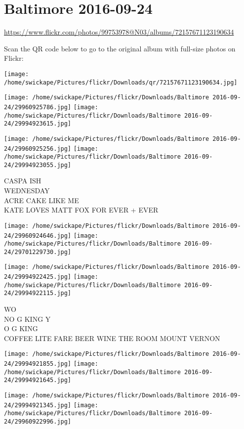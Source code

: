 \documentclass[10pt,letterpaper]{article}
\title{}
\author{}
\date{}
\begin{document}
\section*{Baltimore 2016-09-24}

\url{https://www.flickr.com/photos/99753978@N03/albums/72157671123190634}

Scan the QR code below to go to the original album with full-size photos on Flickr:

\texttt{[image: /home/swickape/Pictures/flickr/Downloads/qr/72157671123190634.jpg]}
\pagebreak

\texttt{[image: /home/swickape/Pictures/flickr/Downloads/Baltimore 2016-09-24/29960925786.jpg]}
\texttt{[image: /home/swickape/Pictures/flickr/Downloads/Baltimore 2016-09-24/29994923615.jpg]}

\texttt{[image: /home/swickape/Pictures/flickr/Downloads/Baltimore 2016-09-24/29960925256.jpg]}
\texttt{[image: /home/swickape/Pictures/flickr/Downloads/Baltimore 2016-09-24/29994923055.jpg]}

CASPA ISH\\
WEDNESDAY\\
ACRE CAKE LIKE ME\\
KATE LOVES MATT FOX FOR EVER + EVER
\pagebreak

\texttt{[image: /home/swickape/Pictures/flickr/Downloads/Baltimore 2016-09-24/29960924646.jpg]}
\texttt{[image: /home/swickape/Pictures/flickr/Downloads/Baltimore 2016-09-24/29701229730.jpg]}

\texttt{[image: /home/swickape/Pictures/flickr/Downloads/Baltimore 2016-09-24/29994922425.jpg]}
\texttt{[image: /home/swickape/Pictures/flickr/Downloads/Baltimore 2016-09-24/29994922115.jpg]}

WO\\
NO G KING Y\\
O G KING\\
COFFEE LITE FARE BEER WINE THE ROOM MOUNT VERNON
\pagebreak

\texttt{[image: /home/swickape/Pictures/flickr/Downloads/Baltimore 2016-09-24/29994921855.jpg]}
\texttt{[image: /home/swickape/Pictures/flickr/Downloads/Baltimore 2016-09-24/29994921645.jpg]}

\texttt{[image: /home/swickape/Pictures/flickr/Downloads/Baltimore 2016-09-24/29994921345.jpg]}
\texttt{[image: /home/swickape/Pictures/flickr/Downloads/Baltimore 2016-09-24/29960922996.jpg]}
\end{document}

